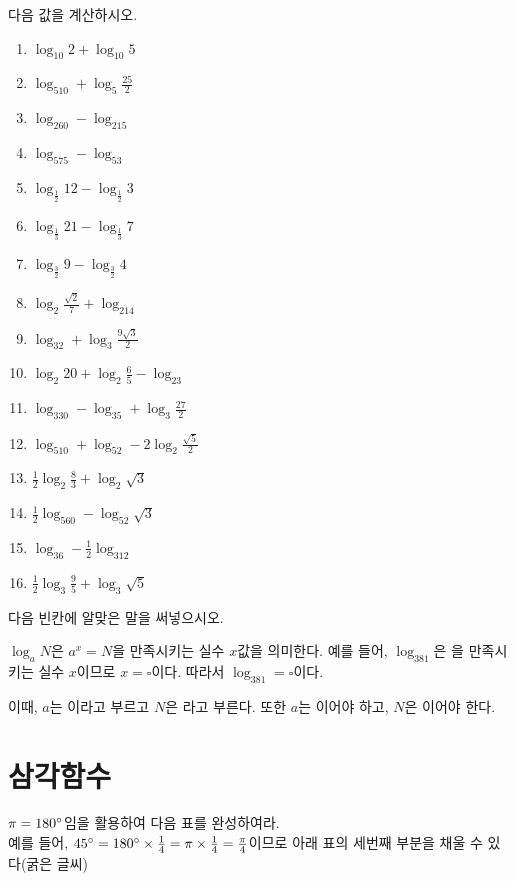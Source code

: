 \documentclass[a4paper]{oblivoir}
\begin{document}
%
\prob
다음 값을 계산하시오.
\begin{enumerate}[(1)]
\item
\(\log_{10}2+\log_{10}5\)
\item
\(\log_510+\log_5\frac{25}2\)
\item
\(\log_260-\log_215\)
\item
\(\log_575-\log_53\)
\item
\(\log_{\frac12}12-\log_{\frac12}3\)
\item
\(\log_{\frac13}21-\log_{\frac13}7\)
\item
\(\log_{\frac32}9-\log_{\frac32}4\)
\item
\(\log_2{\frac{\sqrt2}7}+\log_214\)
\item
\(\log_32+\log_3\frac{9\sqrt3}2\)
\item
\(\log_2{20}+\log_2\frac65-\log_23\)
\item
\(\log_330-\log_35+\log_3\frac{27}2\)
\item
\(\log_510+\log_52-2\log_2\frac{\sqrt5}2\)
\item
\(\frac12\log_2\frac83+\log_2\sqrt3\)
\item
\(\frac12\log_560-\log_52\sqrt3\)
\item
\(\log_36-\frac12\log_312\)
\item
\(\frac12\log_3\frac95+\log_3\sqrt5\)
\end{enumerate}

%
\prob
다음 빈칸에 알맞은 말을 써넣으시오.
\begin{mdframed}
\(\log_aN\)은
\(a^x=N\)을 만족시키는 실수 \(x\)값을 의미한다.
예를 들어, \(\log_381\)은
을 만족시키는 실수 \(x\)이므로 \(x=\square\)이다.
따라서 \(\log_381=\square\)이다.

이때, \(a\)는 이라고 부르고 \(N\)은 라고 부른다.
또한 \(a\)는 이어야 하고, \(N\)은 이어야 한다.
\end{mdframed}

\section{삼각함수}
%
\prob
\(\pi=180\degree\)임을 활용하여 다음 표를 완성하여라.\\[10pt]
예를 들어, \(45\degree=180\degree\times\frac14=\pi\times\frac14=\frac\pi4\)이므로 아래 표의 세번째 부분을 채울 수 있다(굵은 글씨)
\par\bigskip\noindent
{}
\end{document}
